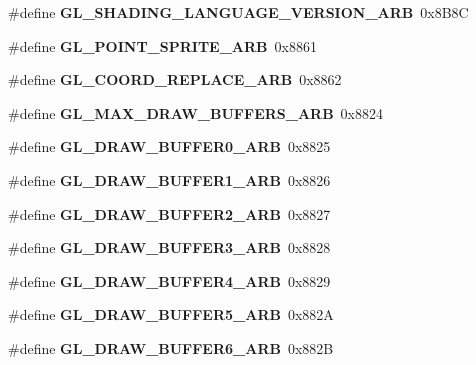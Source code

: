 \begin{DoxyCompactItemize}
\item 
\#define {\bfseries G\+L\+\_\+\+S\+H\+A\+D\+I\+N\+G\+\_\+\+L\+A\+N\+G\+U\+A\+G\+E\+\_\+\+V\+E\+R\+S\+I\+O\+N\+\_\+\+A\+R\+B}~0x8\+B8\+C\label{_s_d_l__opengl_8h_abb4476a6c23e8fc45eefd74b6576b49f}

\item 
\#define {\bfseries G\+L\+\_\+\+P\+O\+I\+N\+T\+\_\+\+S\+P\+R\+I\+T\+E\+\_\+\+A\+R\+B}~0x8861\label{_s_d_l__opengl_8h_a08d2c10e808cb35e1eb1f067321a0a00}

\item 
\#define {\bfseries G\+L\+\_\+\+C\+O\+O\+R\+D\+\_\+\+R\+E\+P\+L\+A\+C\+E\+\_\+\+A\+R\+B}~0x8862\label{_s_d_l__opengl_8h_acb7631ab9790175dd5256ba6fb7b0a71}

\item 
\#define {\bfseries G\+L\+\_\+\+M\+A\+X\+\_\+\+D\+R\+A\+W\+\_\+\+B\+U\+F\+F\+E\+R\+S\+\_\+\+A\+R\+B}~0x8824\label{_s_d_l__opengl_8h_ae31358785fa6bf90a9d45e9b10bc4f23}

\item 
\#define {\bfseries G\+L\+\_\+\+D\+R\+A\+W\+\_\+\+B\+U\+F\+F\+E\+R0\+\_\+\+A\+R\+B}~0x8825\label{_s_d_l__opengl_8h_a5fa6b22241789664662336f9c80f111e}

\item 
\#define {\bfseries G\+L\+\_\+\+D\+R\+A\+W\+\_\+\+B\+U\+F\+F\+E\+R1\+\_\+\+A\+R\+B}~0x8826\label{_s_d_l__opengl_8h_a2b9b1aad21cfcef7c75d5017e94f7519}

\item 
\#define {\bfseries G\+L\+\_\+\+D\+R\+A\+W\+\_\+\+B\+U\+F\+F\+E\+R2\+\_\+\+A\+R\+B}~0x8827\label{_s_d_l__opengl_8h_a326a36b2357e5e36600cd65d9f76abac}

\item 
\#define {\bfseries G\+L\+\_\+\+D\+R\+A\+W\+\_\+\+B\+U\+F\+F\+E\+R3\+\_\+\+A\+R\+B}~0x8828\label{_s_d_l__opengl_8h_adc5ddc92dc3e28fa678a7d648fda123d}

\item 
\#define {\bfseries G\+L\+\_\+\+D\+R\+A\+W\+\_\+\+B\+U\+F\+F\+E\+R4\+\_\+\+A\+R\+B}~0x8829\label{_s_d_l__opengl_8h_a53a7d2fb097f31fb39d5346150da3a2c}

\item 
\#define {\bfseries G\+L\+\_\+\+D\+R\+A\+W\+\_\+\+B\+U\+F\+F\+E\+R5\+\_\+\+A\+R\+B}~0x882\+A\label{_s_d_l__opengl_8h_a30e3def5005860a8d90d947592212ae6}

\item 
\#define {\bfseries G\+L\+\_\+\+D\+R\+A\+W\+\_\+\+B\+U\+F\+F\+E\+R6\+\_\+\+A\+R\+B}~0x882\+B\label{_s_d_l__opengl_8h_a6483a20f6b0fd121b9e61b43c3d8de27}


\end{DoxyCompactItemize}
